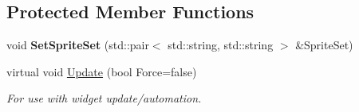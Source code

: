 \subsection*{Protected Member Functions}
\begin{DoxyCompactItemize}
\item 
\hypertarget{classphys_1_1UI_1_1CheckBox_ac20138946e42c608ac0808fc40fce4ce}{
void {\bfseries SetSpriteSet} (std::pair$<$ std::string, std::string $>$ \&SpriteSet)}
\label{dd/d10/classphys_1_1UI_1_1CheckBox_ac20138946e42c608ac0808fc40fce4ce}

\item 
\hypertarget{classphys_1_1UI_1_1CheckBox_ad988ce71809fd1dea6def42da50232eb}{
virtual void \hyperlink{classphys_1_1UI_1_1CheckBox_ad988ce71809fd1dea6def42da50232eb}{Update} (bool Force=false)}
\label{dd/d10/classphys_1_1UI_1_1CheckBox_ad988ce71809fd1dea6def42da50232eb}

\begin{DoxyCompactList}\small\item\em For use with widget update/automation. \item\end{DoxyCompactList}\end{DoxyCompactItemize}
